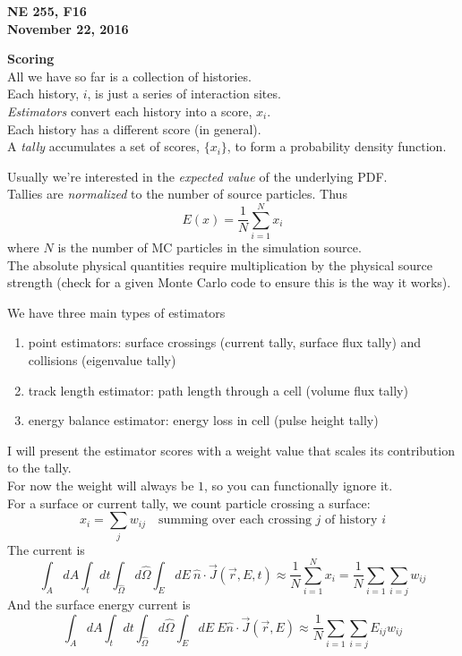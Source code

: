 \documentclass[12pt]{article}
\newcommand{\rvec}{\ensuremath{\vec{r}}}
\newcommand{\vOmega}{\ensuremath{\hat{\Omega}}}
\begin{document}
\begin{center}
{\bf NE 255, F16\\
November 22, 2016 
}
\end{center}

\textbf{Scoring}\\
All we have so far is a collection of histories.\\
Each history, $i$, is just a series of interaction sites.\\
\textit{Estimators} convert each history into a score, $x_i$. \\
Each history has a different score (in general).\\
A \textit{tally} accumulates a set of scores, $\{x_i\}$, to form a probability density function.

Usually we're interested in the \textit{expected value} of the underlying PDF. \\
Tallies are \textit{normalized} to the number of source particles. Thus
\[
E(x) = \frac{1}{N} \sum_{i=1}^N x_i
\]
where $N$ is the number of MC particles in the simulation source.\\
The absolute physical quantities require multiplication by the physical source strength (check for a given Monte Carlo code to ensure this is the way it works). 


We have three main types of estimators
\begin{enumerate}
\item point estimators: surface crossings (current tally, surface flux tally) and collisions (eigenvalue tally)
\item track length estimator: path length through a cell (volume flux tally)
\item energy balance estimator: energy loss in cell (pulse height tally)
\end{enumerate}
%
I will present the estimator scores with a weight value that scales its contribution to the tally.\\
For now the weight will always be $1$, so you can functionally ignore it. \\

For a surface or current tally, we count particle crossing a surface:
\[
x_i = \sum_j w_{ij} \quad \text{summing over each crossing }j\text{ of history }i
\]
The current is
\[
\int_A dA \int_t dt \int_{\vOmega} d\vOmega \int_E dE\: \hat{n} \cdot \vec{J}(\rvec, E, t) \approx \frac{1}{N} \sum_{i=1}^N x_i = \frac{1}{N} \sum_{i=1}\sum_{i=j} w_{ij}
\]
And the surface energy current is
\[
\int_A dA \int_t dt  \int_{\vOmega} d\vOmega \int_E dE\: E\hat{n} \cdot \vec{J}(\rvec, E) \approx \frac{1}{N} \sum_{i=1}\sum_{i=j} E_{ij}w_{ij}
\]
\end{document}
